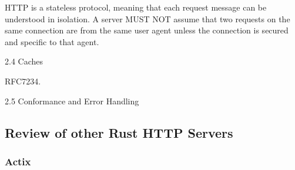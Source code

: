 \documentclass[12pt, a4paper]{article}
\begin{document}
HTTP is a stateless protocol, meaning that each request message can be understood in isolation.
A server MUST NOT assume that two requests on the same connection are from the same user
agent unless the connection is secured and specific to that agent.

2.4 Caches

RFC7234.

2.5 Conformance and Error Handling


\subsection{Review of other Rust HTTP Servers}

\subsubsection{Actix}

    
\printbibliography
\end{document}
